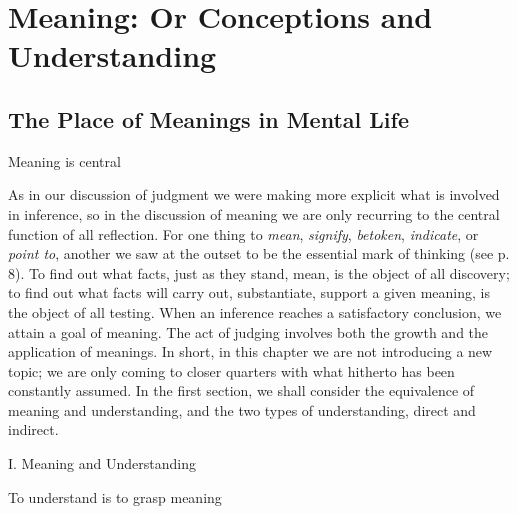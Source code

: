 \documentclass[letterpaper]{book}
\begin{document}
\chapter{Meaning: Or Conceptions and Understanding}

\section{The Place of Meanings in Mental Life}

Meaning is central

As in our discussion of judgment we were making more explicit what is
involved in inference, so in the discussion of meaning we are only
recurring to the central function of all reflection. For one thing to
\emph{mean}, \emph{signify}, \emph{betoken}, \emph{indicate}, or
\emph{point to}, another we saw at the outset to be the essential mark
of thinking (see p. 8). To find out what facts, just as they stand,
mean, is the object of all discovery; to find out what facts will carry
out, substantiate, support a given meaning, is the object of all
testing. When an inference reaches a satisfactory conclusion, we attain
a goal of meaning. The act of judging involves both the growth and the
application of meanings. In short, in this chapter we are not
introducing a new topic; we are only coming to closer quarters with what
hitherto has been constantly assumed. In the first section, we shall
consider the equivalence of meaning and understanding, and the two types
of understanding, direct and indirect.

I. {Meaning and Understanding}

To understand is to grasp meaning
\end{document}
